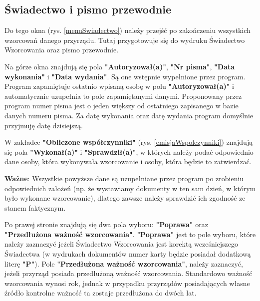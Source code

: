 \subsection{Świadectwo i pismo przewodnie}
\label{swiadectwo_pismo}

	Do tego okna (rys. \ref{menuSwiadectwo}) należy przejść po zakończeniu wszystkich wzorcowań danego przyrządu. Tutaj przygotowuje się do wydruku Świadectwo Wzorcowania oraz pismo przewodnie. 
	
	Na górze okna znajdują się pola \textbf{"Autoryzował(a)"}, \textbf{"Nr pisma"}, \textbf{"Data wykonania"} i \textbf{"Data wydania"}. Są one wstępnie wypełnione przez program. Program zapamiętuje ostatnio wpisaną osobę w polu \textbf{"Autoryzował(a)"} i automatycznie uzupełnia to pole zapamiętanymi danymi. Proponowany przez program numer pisma jest o jeden większy od ostatniego zapisanego w bazie danych numeru pisma. Za datę wykonania oraz datę wydania program domyślnie przyjmuję datę dzisiejszą.

	W zakładce \textbf{"Obliczone współczynniki"} (rys. \ref{emisjaWspolczynniki}) znajdują się pola \textbf{"Wykonał(a)"} i \textbf{"Sprawdził(a)"}, w których należy podać odpowiednio dane osoby, która wykonywała wzorcowanie i osoby, która będzie to zatwierdzać. 

	\textbf{Ważne}: Wszystkie powyższe dane są uzupełniane przez program po zrobieniu odpowiednich założeń (np. że wystawiamy dokumenty w ten sam dzień, w którym było wykonane wzorcowanie), dlatego zawsze należy sprawdzić ich zgodność ze stanem faktycznym.
	
	Po prawej stronie znajdują się dwa pola wyboru: \textbf{"Poprawa"} oraz \textbf{"Przedłużona ważność wzorcowania"}. \textbf{"Poprawa"} jest to pole wyboru, które należy zaznaczyć jeżeli Świadectwo Wzorcowania jest korektą wcześniejszego Świadectwa (w wydrukach dokumentów numer karty będzie posiadał dodatkową literę \textbf{"P"}). Pole \textbf{"Przedłużona ważność wzorcowania"}, należy zaznaczyć, jeżeli przyrząd posiada przedłużoną ważność wzorcowania. Standardowo ważność wzorcowania wynosi rok, jednak w przypadku przyrządów posiadających własne źródło kontrolne ważność ta zostaje przedłużona do dwóch lat.

